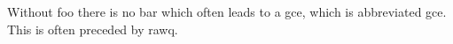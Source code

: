 \documentclass{article}
\begin{document}
Without \gls{foo} there is no \gls{bar} which often leads to a \acrlong{gce},
which is abbreviated \acrshort{gce}. This is often preceded by \gls{rawq}.

\printglossary[type=\acronymtype]
\printglossary
\end{document}
